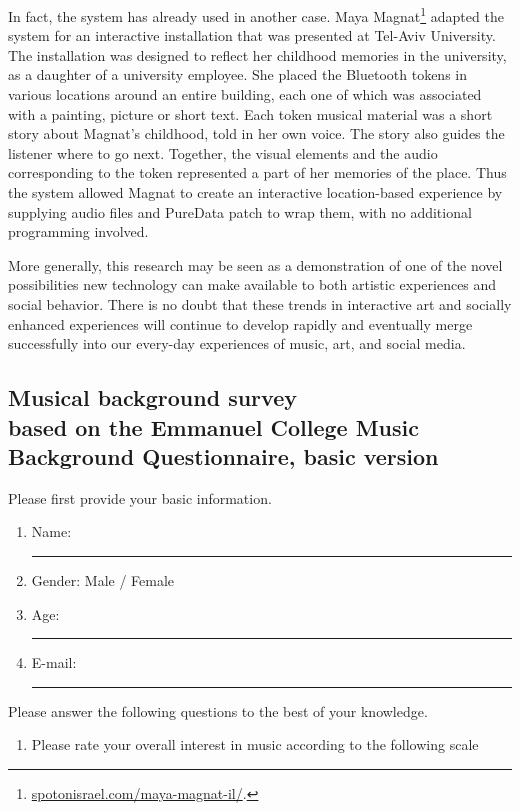 \documentclass[a4paper,11pt]{article}
\newcommand{\myunderline}{\rule{2in}{.5pt}}
\begin{document}
{In fact, the system has already used in another case.
Maya Magnat\footnote{\href{http://spotonisrael.com/maya-magnat-il/}{spotonisrael.com/maya-magnat-il/}.} adapted the system for an interactive installation that was presented at Tel-Aviv University.
The installation was designed to reflect her childhood memories in the university, as a daughter of a university employee.
She placed the Bluetooth tokens in various locations around an entire building, each one of which was associated with a painting, picture or short text.
Each token musical material was a short story about Magnat's childhood, told in her own voice.
The story also guides the listener where to go next.
Together, the visual elements and the audio corresponding to the token represented a part of her memories of the place.
Thus the system allowed Magnat to create an interactive location-based experience by supplying audio files and PureData patch to wrap them, with no additional programming involved.

More generally, this research may be seen as a demonstration of one of the novel possibilities new technology can make available to both artistic experiences and social behavior.
There is no doubt that these trends in interactive art and socially enhanced experiences will continue to develop rapidly and eventually merge successfully into our every-day experiences of music, art, and social media.

\begin{appendices}

\section[Musical background survey]{Musical background survey\\
	{\normalsize based on the Emmanuel College Music Background Questionnaire, basic version}}

Please first provide your basic information.

\begin{enumerate}
	\item Name: \myunderline
	\item Gender: Male / Female
	\item Age: \myunderline
	\item E-mail: \myunderline
\end{enumerate}
Please answer the following questions to the best of your knowledge.
\begin{enumerate}[resume]

	\item Please rate your overall interest in music according to the following scale


\end{enumerate}
\end{appendices}}
\end{document}
